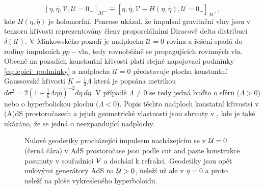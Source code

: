 \begin{equation}
    \label{eq:lepici_podminky}
\left[\eta, \bar{\eta}, \mathcal{V}, \mathcal{U}=0_- \right]_{\mathcal{M}^-} \equiv 
\left[\eta, \bar{\eta}, \mathcal{V}-H\left(\eta, \bar{\eta}\right), \mathcal{U}=0_+  \right]_{\mathcal{M}^+},
\end{equation}
kde $H(\eta, \bar{\eta})$ je holomorfní. Penrose \cite{Penrose:1972xrn} ukázal, že impulsní gravitační vlny
jsou v tenzoru křivosti reprezentovány členy proporciálními Diracově delta distribuci $\delta(\mathcal{U})$.
V Minkowského pozadí je nadplocha $\mathcal{U}=0$ rovina a řešení spadá do rodiny impulsních $pp-$vln, tedy
rovnoběžně se propagujících rovinných vln. Obecně na pozadích konstantní křivosti platí stejné napojovací podmínky
\eqref{eq:lepici_podminky} a nadplocha $\mathcal{U}=0$ představuje plochu konstantní Gaussovské křivosti 
$K=\frac{1}{3}\Lambda$ která je popsána metrikou $d\sigma^2=2(1+\frac{1}{6}\Lambda \eta \bar{\eta})^{-2} 
d\eta~d\bar{\eta}$. V případě $\Lambda \neq 0$ se tedy jedná buďto o sféru
($\Lambda > 0$) nebo o hyperbolickou plochu ($\Lambda < 0$). Popis těchto nadploch konstatní křivostsi v (A)dS prostoročasech a
jejich geometrické vlastnosti jsou shrnuty v \cite{Podolsky:1997ri}, kde je také ukázáno,
že se jedná o neexpandující nadplochy.

\begin{figure}[H]
    \centering
    \caption{Nulové geodetiky procházející impulsem nacházejícím se v $\mathcal{U}=0$ (černá čára) v AdS prostoročase jsou podle cut and paste konstrukce posunuty
    v souřadnici $\mathcal{V}$ a dochází k refrakci. Geodetiky jsou opět nulovými generátory AdS na $\mathcal{U} > 0$, neleží už ale v $\eta = 0$ a proto
    neleží na ploše vykresleného hyperboloidu.}
\end{figure}

